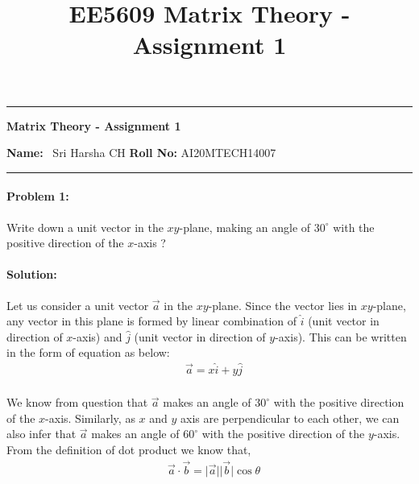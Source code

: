 \documentclass[12pt]{scrartcl}
\title{EE5609 Matrix Theory - Assignment 1}
\begin{document}
\begin{center}
	\hrule
	\vspace{.4cm}
	{\textbf { \large  Matrix Theory - Assignment 1}}
\end{center}
{ \textbf{Name:}} \ Sri Harsha CH \hspace{\fill} \textbf{Roll No:} AI20MTECH14007 \\
	\hrule

\paragraph*{Problem 1:} %
 Write down a unit vector in the $xy$\nobreakdash-plane, making an angle of $30^{\circ}$ with the positive direction of the $x$-axis ?


\paragraph*{Solution: } %
 Let us consider a unit vector $\vec{a}$ in the $xy$\nobreakdash-plane.
 Since the vector lies in $xy$\nobreakdash-plane, any vector in this plane is formed by linear combination of $\hat{i}$ (unit vector in direction of $x$-axis) and $\hat{j}$ (unit vector in direction of $y$-axis). 
 \newline 
 This can be written in the form of equation as below:
 \begin{align*}
& \vec{a}  = x\hat{i} + y\hat{j}\\
\end{align*}

We know from question that $\vec{a}$ makes an angle of $30^{\circ}$ with the positive direction of the $x$-axis.
Similarly, as $x$ and $y$ axis are perpendicular to each other, we can also infer that $\vec{a}$ makes an angle of $60^{\circ}$ with the positive direction of the $y$-axis.
\newline
\newline
From the definition of dot product we know that,
 \begin{align*}
& \vec{a} \cdot \vec{b}  = \lvert \vec{a} \rvert \lvert \vec{b} \rvert \cos{\theta}\\
\end{align*}
\end{document}
